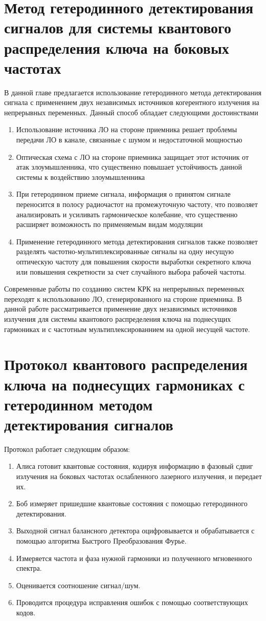 \section{Метод гетеродинного детектирования сигналов для системы квантового распределения ключа на боковых частотах}\label{sec:ch3/sec1} 
В данной главе предлагается использование гетеродинного метода детектирования сигнала с применением двух независимых источников когерентного излучения на непрерывных переменных. Данный способ обладает следующими достоинствами
\begin{enumerate}
    \item Использование источника ЛО на стороне приемника решает проблемы передачи ЛО в канале, связанные с шумом и недостаточной мощностью
    \item Оптическая схема с ЛО на стороне приемника защищает этот источник от атак злоумышленника, что существенно повышает устойчивость данной системы к воздействию злоумышленника
    \item При гетеродинном приеме сигнала, информация о принятом сигнале переносится в полосу радиочастот на промежуточную частоту, что позволяет анализировать и усиливать гармоническое колебание, что существенно расширяет возможность по применяемым видам модуляции
    \item Применение гетеродинного метода детектирования сигналов также позволяет разделять частотно-мультиплексированные сигналы на одну несущую оптическую частоту для повышения скорости выработки секретного ключа или повышения секретности за счет случайного выбора рабочей частоты.
\end{enumerate}
Современные работы по созданию систем КРК на непрерывных переменных переходят к использованию ЛО, сгенерированного на стороне приемника. В данной работе рассматривается применение двух независимых источников излучения для системы квантового распределения ключа на поднесущих гармониках и с частотным мультиплексированнием на одной несущей частоте.
\section{Протокол квантового распределения ключа на поднесущих гармониках с гетеродинном методом детектирования сигналов}\label{sec:ch3/sect2}
Протокол работает следующим образом:
\begin{enumerate}
    \item Алиса готовит квантовые состояния, кодируя информацию в фазовый сдвиг излучения на боковых частотах ослабленного лазерного излучения, и передает их.
    \item Боб измеряет пришедшие квантовые состояния с помощью гетеродинного детектирования.
    \item Выходной сигнал балансного детектора оцифровывается и обрабатывается с помощью алгоритма Быстрого Преобразования Фурье.
    \item Измеряется частота и фаза нужной гармоники из полученного мгновенного спектра.
    \item Оценивается соотношение сигнал/шум.
    \item Проводится процедура исправления ошибок с помощью соответствующих кодов.
\end{enumerate}
